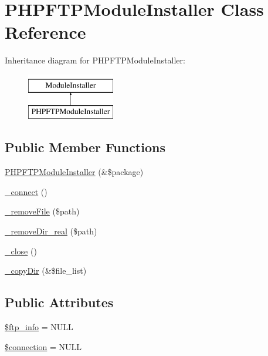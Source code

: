 \hypertarget{classPHPFTPModuleInstaller}{}\section{P\+H\+P\+F\+T\+P\+Module\+Installer Class Reference}
\label{classPHPFTPModuleInstaller}
Inheritance diagram for P\+H\+P\+F\+T\+P\+Module\+Installer\+:\begin{figure}[H]
\begin{center}
\leavevmode
\includegraphics[height=2.000000cm]{classPHPFTPModuleInstaller}
\end{center}
\end{figure}
\subsection*{Public Member Functions}
\begin{DoxyCompactItemize}
\item 
\hyperlink{classPHPFTPModuleInstaller_a8bd8f79d6614af9e7d28ee497dc9eea1}{P\+H\+P\+F\+T\+P\+Module\+Installer} (\&\$package)
\item 
\hyperlink{classPHPFTPModuleInstaller_a17bd035c8cc7030a56feedf6562de616}{\+\_\+connect} ()
\item 
\hyperlink{classPHPFTPModuleInstaller_a6bfd41813d9f70b9e2ee06deb709742f}{\+\_\+remove\+File} (\$path)
\item 
\hyperlink{classPHPFTPModuleInstaller_abc79bfe0eea3d10f91672313cf8763c0}{\+\_\+remove\+Dir\+\_\+real} (\$path)
\item 
\hyperlink{classPHPFTPModuleInstaller_aa50f708fe4f367338fc95303e9425f83}{\+\_\+close} ()
\item 
\hyperlink{classPHPFTPModuleInstaller_ae9c696b9a99eea744500a23c2f30c81a}{\+\_\+copy\+Dir} (\&\$file\+\_\+list)
\end{DoxyCompactItemize}
\subsection*{Public Attributes}
\begin{DoxyCompactItemize}
\item 
\hyperlink{classPHPFTPModuleInstaller_abaa70235f6af643fc8d90fbecbc1892a}{\$ftp\+\_\+info} = N\+U\+LL
\item 
\hyperlink{classPHPFTPModuleInstaller_ab10c7e99865e2ba8ca058987dd81a986}{\$connection} = N\+U\+LL
\end{DoxyCompactItemize}


